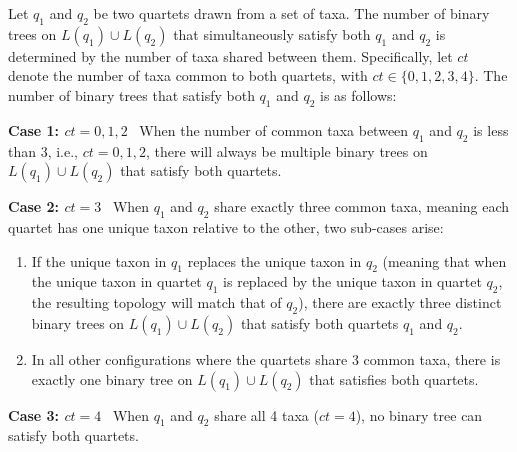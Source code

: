 \documentclass[runningheads]{llncs}
\begin{document}
\begin{theorem} 
\label{thm:conflict}
Let $q_1$ and $q_2$ be two quartets drawn from a set of taxa. The number of binary trees on $L(q_1) \cup L(q_2)$ that simultaneously satisfy both $q_1$ and $q_2$ is determined by the number of taxa shared between them. Specifically, let $ct$ denote the number of taxa common to both quartets, with $ct \in \{0,1,2,3,4\}$. The number of binary trees that satisfy both $q_1$ and $q_2$ is as follows: 


\textbf{Case 1: $ct = 0, 1, 2$} \ When the number of common taxa between $q_1$ and $q_2$ is less than 3, i.e., $ct = 0, 1, 2$, there will always be multiple binary trees on $L(q_1) \cup L(q_2)$ that satisfy both quartets.

\vspace{2pt}

\textbf{Case 2: $ct = 3$} \ When $q_1$ and $q_2$ share exactly three common taxa, meaning each quartet has one unique taxon relative to the other, two sub-cases arise: 

\vspace{-5pt}

    \begin{enumerate} 
        \item If the unique taxon in $q_1$ replaces the unique taxon in $q_2$ (meaning that when the unique taxon in quartet $q_1$ is replaced by the unique taxon in quartet $q_2$, the resulting topology will match that of $q_2$), there are exactly three distinct binary trees on $L(q_1) \cup L(q_2)$ that satisfy both quartets $q_1$ and $q_2$.
        \item In all other configurations where the quartets share 3 common taxa, there is exactly one binary tree on $L(q_1) \cup L(q_2)$ that satisfies both quartets. 
    \end{enumerate}

\vspace{-3pt}

\textbf{Case 3: $ct = 4$} \ When $q_1$ and $q_2$ share all 4 taxa ($ct = 4$), no binary tree can satisfy both quartets. %
\end{theorem}
\end{document}
